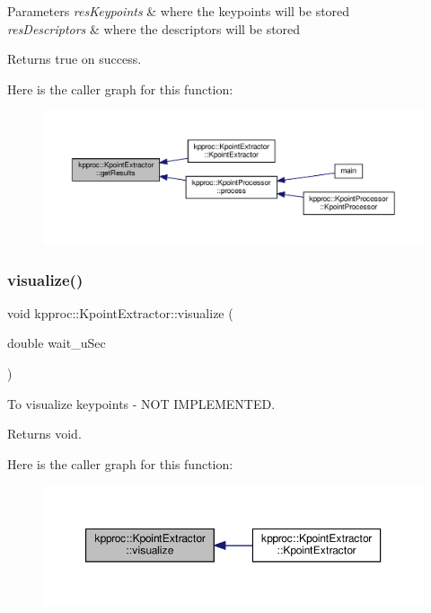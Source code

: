 \begin{DoxyParams}{Parameters}
{\em res\+Keypoints} & where the keypoints will be stored \\
\hline
{\em res\+Descriptors} & where the descriptors will be stored\\
\hline
\end{DoxyParams}
\begin{DoxyReturn}{Returns}
true on success. 
\end{DoxyReturn}
Here is the caller graph for this function\+:\nopagebreak
\begin{figure}[H]
\begin{center}
\leavevmode
\includegraphics[width=350pt]{classkpproc_1_1KpointExtractor_a167e3596663206cb24e9eefe54baf4be_icgraph}
\end{center}
\end{figure}
\mbox{\label{classkpproc_1_1KpointExtractor_a52e3033d4c95115f76315c228d3a1350}} 
\subsubsection{\texorpdfstring{visualize()}{visualize()}}
{\footnotesize\ttfamily void kpproc\+::\+Kpoint\+Extractor\+::visualize (\begin{DoxyParamCaption}\item[{double}]{wait\+\_\+u\+Sec }\end{DoxyParamCaption})}



To visualize keypoints -\/ N\+OT I\+M\+P\+L\+E\+M\+E\+N\+T\+ED. 

\begin{DoxyReturn}{Returns}
void. 
\end{DoxyReturn}
Here is the caller graph for this function\+:\nopagebreak
\begin{figure}[H]
\begin{center}
\leavevmode
\includegraphics[width=350pt]{classkpproc_1_1KpointExtractor_a52e3033d4c95115f76315c228d3a1350_icgraph}
\end{center}
\end{figure}


